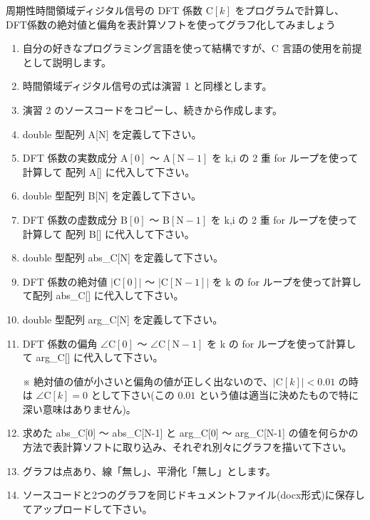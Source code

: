 \documentclass[a4paper]{jarticle}
\begin{document}
 周期性時間領域ディジタル信号の DFT 係数 $\textrm{C}[k]$ をプログラムで計算し、DFT係数の絶対値と偏角を表計算ソフトを使ってグラフ化してみましょう  \par
\par\vspace{1zh}
\begin{enumerate}
\item 自分の好きなプログラミング言語を使って結構ですが、C 言語の使用を前提として説明します。
\item 時間領域ディジタル信号の式は演習 1 と同様とします。
\item 演習 2 のソースコードをコピーし、続きから作成します。
\item double 型配列 A[N] を定義して下さい。
\item DFT 係数の実数成分 $\textrm{A}[0]$ 〜 $\textrm{A}[\textrm{N}-1]$ を k,i の 2 重 for ループを使って計算して 配列 A[] に代入して下さい。
\item double 型配列 B[N] を定義して下さい。
\item DFT 係数の虚数成分 $\textrm{B}[0]$ 〜 $\textrm{B}[\textrm{N}-1]$ を k,i の 2 重 for ループを使って計算して 配列 B[] に代入して下さい。
\item double 型配列 abs\_C[N] を定義して下さい。
\item DFT 係数の絶対値 $|\textrm{C}[0]|$ 〜 $|\textrm{C}[\textrm{N}-1]|$ を k の for ループを使って計算して配列 abs\_C[] に代入して下さい。
\item double 型配列 arg\_C[N] を定義して下さい。
\item DFT 係数の偏角 $\angle\textrm{C}[0]$ 〜 $\angle\textrm{C}[\textrm{N}-1]$ を k の for ループを使って計算して arg\_C[]  に代入して下さい。\par
 ※  絶対値の値が小さいと偏角の値が正しく出ないので、$|\textrm{C}[k]| < 0.01$ の時は $\angle\textrm{C}[k] = 0$ として下さい(この $0.01$ という値は適当に決めたもので特に深い意味はありません)。\par
\item 求めた abs\_C[0] 〜  abs\_C[N-1] と arg\_C[0] 〜 arg\_C[N-1] の値を何らかの方法で表計算ソフトに取り込み、それぞれ別々にグラフを描いて下さい。
\item グラフは点あり、線「無し」、平滑化「無し」とします。
\item ソースコードと2つのグラフを同じドキュメントファイル(docx形式)に保存してアップロードして下さい。
\end{enumerate}
\end{document}
